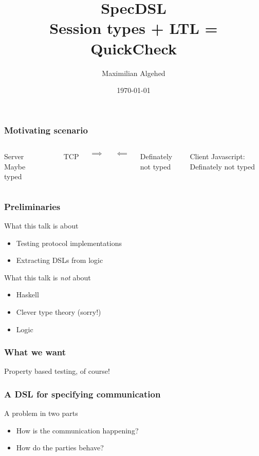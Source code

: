 \documentclass{beamer}
\title[SpecDSL]{SpecDSL \\ \large{Session types + LTL = QuickCheck}}
\author{Maximilian Algehed} %
\institute[CTH] %
{
Chalmers University of Technology \\ %
\medskip
\textit{m.algehed@gmail.com} %
}
\date{\today} %
\begin{document}
\begin{frame}
    \titlepage %
\end{frame}

\begin{frame}
    \frametitle{Motivating scenario}
    \begin{columns}
        \begin{block}{Server}
            \small{Maybe typed}
        \end{block}

        \\
        \centerline{TCP}
        \centerline{\Large{$\implies$}}
        \centerline{\Large{$\impliedby$}}
        \centerline{Definately not typed}

        \begin{block}{Client}
            \small{Javascript: Definately not typed}
        \end{block}
        
    \end{columns}
\end{frame}

\begin{frame}
    \frametitle{Preliminaries}
    \Large{What this talk is about}
    \begin{itemize}
        \item Testing protocol implementations
        \item Extracting DSLs from logic
    \end{itemize}
    \pause
    \Large{What this talk is \emph{not} about}
    \begin{itemize}
        \item Haskell
        \item Clever type theory (sorry!)
        \item Logic
    \end{itemize}
\end{frame}


\begin{frame}
    \frametitle{What we want}
    \centering
    \Large{Property based testing, of course!}
\end{frame}

\begin{frame}
    \frametitle{A DSL for specifying communication}
    \centering
    \Large{A problem in two parts}
    \begin{itemize}
        \item How is the communication happening?
        \item How do the parties behave?
    \end{itemize}
\end{frame}
\end{document}
